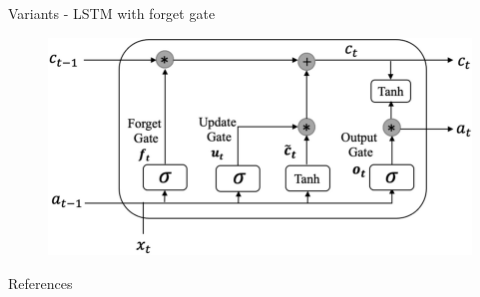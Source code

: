 \documentclass[10pt, aspectratio=169]{beamer}
\begin{document}
\begin{frame}[t]{Variants - LSTM with forget gate}
\begin{figure}
    \centering
    \includegraphics[width=0.75\linewidth]{images/Structure-of-LSTM-cell-which-introduces-three-special-gates-Input-Gate-i-Forget-Gate.png}
\end{figure}
\end{frame}


\nocite{DoesNotExist}

\begin{frame}[allowframebreaks]{References}

  
  

\end{frame}
\end{document}
